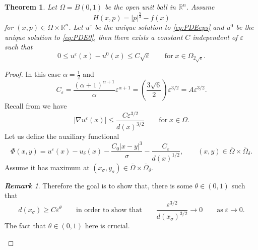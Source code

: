 \documentclass[11pt,reqno]{amsart}
\numberwithin{figure}{section}
\theoremstyle{plain}
\newtheorem{thm}{Theorem}[section]
\theoremstyle{remark}
\newtheorem{rem}{\bf{Remark}}
\numberwithin{equation}{section}
\begin{document}
\begin{thm}\label{thm:rate_doubling1} Let $\Omega = B(0,1)$ be the open unit ball in $\mathbb{R}^n$. Assume
\begin{equation*}
    H(x,p) = |p|^{\frac{5}{3}} - f(x)
\end{equation*}
for $(x,p)\in \Omega\times\mathbb{R}^n$. Let $u^\varepsilon$ be the unique solution to \eqref{eq:PDEeps} and $u^0$ be the unique solution to \eqref{eq:PDE0}, then there exists a constant $C$ independent of $\varepsilon$ such that
\begin{equation*}
    0\leq u^\varepsilon(x) - u^0(x) \leq C\sqrt{\varepsilon} \qquad\text{for}\;x\in \Omega_{2\sqrt{\varepsilon}}.
\end{equation*}
\end{thm}
\begin{proof} In this case $\alpha = \frac{1}{2}$ and 
\begin{equation*}
    C_\varepsilon = \frac{(\alpha+1)^{\alpha+1}}{\alpha}\varepsilon^{\alpha+1} = \left(\frac{3\sqrt{6}}{2}\right)\varepsilon^{3/2} = A\varepsilon^{3/2}.
\end{equation*}
Recall from \cite{alessio_asymptotic_2006} we have
\begin{equation*}
|\nabla u^\varepsilon(x)|  \leq \frac{C\varepsilon^{3/2}}{d(x)^{3/2}} \qquad\text{for}\;x\in \Omega.
\end{equation*}
Let us define the auxiliary functional
\begin{equation*}
    \Phi(x,y) = u^\varepsilon(x) - u_\delta(x) -\frac{C_0|x-y|^3}{\sigma} - \frac{C_\varepsilon}{d(x)^{1/2}}, \qquad (x,y)\in \overline{\Omega}\times \overline{\Omega}_\delta.
\end{equation*}
Assume it has maximum at $(x_\sigma,y_\sigma)\in \overline{\Omega}\times \overline{\Omega}_\delta$. 

\begin{rem} \color{blue} Therefore the goal is to show that, there is some $\theta\in (0,1)$ such that
\begin{equation*}
    d(x_\sigma)\geq C\varepsilon^\theta \qquad\text{in order to show that}\qquad \frac{\varepsilon^{3/2}}{d(x_\sigma)^{3/2}} \rightarrow 0 \qquad\text{as}\;\varepsilon\to 0.
\end{equation*}
The fact that $\theta \in (0,1)$ here is crucial.
\color{black}
\end{rem}
\noindent 

\end{proof} 
\end{document}
